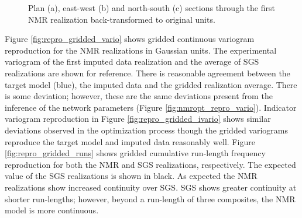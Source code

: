 \begin{figure}
    \centering
    \tabskip=0pt
    \caption{Plan (a), east-west (b) and north-south (c) sections through the first \gls{NMR} realization back-transformed to original units.}
    \label{fig:orig_reals}
\end{figure}


Figure \ref{fig:repro_gridded_vario} shows gridded continuous variogram reproduction for the \gls{NMR} realizations in Gaussian units. The experimental variogram of the first imputed data realization and the average of \gls{SGS} realizations are shown for reference. There is reasonable agreement between the target model (blue), the imputed data and the gridded realization average. There is some deviation; however, these are the same deviations present from the inference of the network parameters (Figure \ref{fig:nmropt_repro_vario}). Indicator variogram reproduction in Figure \ref{fig:repro_gridded_ivario} shows similar deviations observed in the optimization process though the gridded variograms reproduce the target model and imputed data reasonably well. Figure \ref{fig:repro_gridded_runs} shows gridded cumulative run-length frequency reproduction for both the \gls{NMR} and \gls{SGS} realizations, respectively. The expected value of the \gls{SGS} realizations is shown in black. As expected the \gls{NMR} realizations show increased continuity over \gls{SGS}. \gls{SGS} shows greater continuity at shorter run-lengths; however, beyond a run-length of three composites, the \gls{NMR} model is more continuous.


